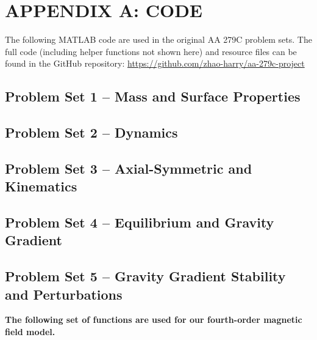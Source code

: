 \appendix

\section{APPENDIX A: CODE}
The following MATLAB code are used in the original AA 279C problem sets. The full code (including helper functions not shown here) and resource files can be found in the GitHub repository: \url{https://github.com/zhao-harry/aa-279c-project}

\subsection{Problem Set 1 – Mass and Surface Properties}


\newpage
\subsection{Problem Set 2 – Dynamics}








\newpage
\subsection{Problem Set 3 – Axial-Symmetric and Kinematics}



\newpage
\subsection{Problem Set 4 – Equilibrium and Gravity Gradient}



\newpage
\subsection{Problem Set 5 – Gravity Gradient Stability and Perturbations}





\newpage
\textbf{The following set of functions are used for our fourth-order magnetic field model.}






